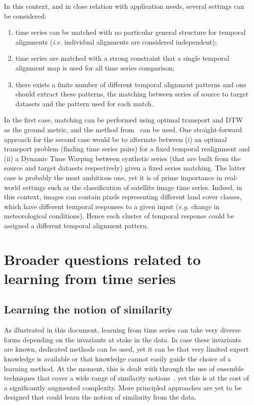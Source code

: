 In this context, and in close relation with application needs, several settings
can be considered:

\begin{enumerate}
\item time series can be matched with no particular general structure for temporal
alignments (\emph{i.e.} individual alignments are considered independent);
\item time series are matched with a strong constraint that a single temporal
alignment map is used for all time series comparison;
\item there exists a finite number of different temporal alignment patterns and
one should extract these patterns, the matching between series of source
to target datasets and the pattern used for each match.
\end{enumerate}

In the first
case, matching can be performed using optimal transport and DTW as the ground
metric, and the method from~\cite{courty:hal-02112785} can be used.
One straight-forward approach for the second case would be to alternate
between (i) an optimal transport
problem (finding time series pairs) for a fixed temporal realignment and (ii) a
Dynamic Time Warping between synthetic series (that are built from the source
and target datasets respectively) given a fixed series matching.
The latter case is probably the most ambitious one, yet it is of prime
importance in real-world settings such as the classification of satellite image
time series.
Indeed, in this context, images can contain pixels representing different land
cover classes, which have different temporal responses to a given input
(\emph{e.g.} change in meteorological conditions).
Hence each cluster of temporal response could be assigned a different temporal
alignment pattern.

\section{Broader questions related to learning from time series}

\subsection{Learning the notion of similarity}

As illustrated in this document, learning from time series can take very diverse
forms depending on the invariants at stake in the data.
In case these invariants are known, dedicated methods can be used, yet it
can be that very limited expert knowledge is available or that knowledge cannot
easily guide the choice of a learning method.
At the moment, this is dealt with through the use of ensemble techniques that
cover a wide range of similarity notions~\cite{lines2018time},
yet this is at the cost of a significantly augmented complexity.
More principled approaches are yet to be designed that could learn the notion
of similarity from the data.

